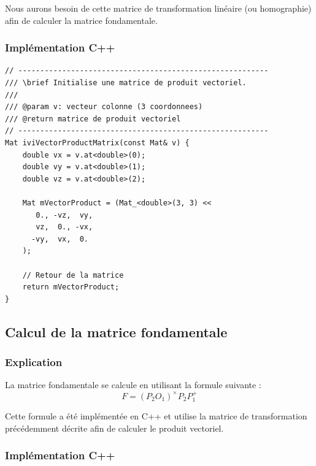 \documentclass[a4paper]{article}
\begin{document}
Nous aurons besoin de cette matrice de transformation linéaire (ou homographie) afin de calculer la matrice fondamentale.

\subsubsection{Implémentation C++}

\begin{lstlisting}
// ---------------------------------------------------------
/// \brief Initialise une matrice de produit vectoriel.
///
/// @param v: vecteur colonne (3 coordonnees)
/// @return matrice de produit vectoriel
// ---------------------------------------------------------
Mat iviVectorProductMatrix(const Mat& v) {
    double vx = v.at<double>(0);
    double vy = v.at<double>(1);
    double vz = v.at<double>(2);

    Mat mVectorProduct = (Mat_<double>(3, 3) <<
       0., -vz,  vy,
       vz,  0., -vx,
      -vy,  vx,  0.
    );

    // Retour de la matrice
    return mVectorProduct;
}
\end{lstlisting}

\clearpage
\subsection{Calcul de la matrice fondamentale}

\subsubsection{Explication}

La matrice fondamentale se calcule en utilisant la formule suivante :
\begin{equation}
  F = (P_2O_1) ^\times P_2P_1^+
\end{equation}

Cette formule a été implémentée en C++ et utilise la matrice de transformation précédemment décrite afin de calculer le produit vectoriel.

\subsubsection{Implémentation C++}
\end{document}
